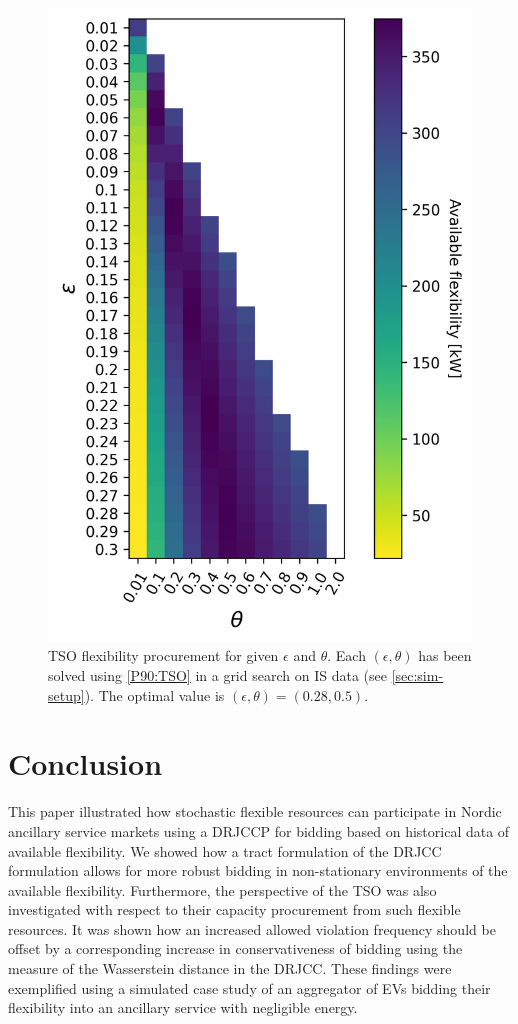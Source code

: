 \documentclass[conference]{IEEEtran}
\begin{document}
\begin{figure}[!t]
    \centering
    \includegraphics[width=0.95\columnwidth]{../figures/heatmap.png}
    \caption{\ac{TSO} flexibility procurement for given $\epsilon$ and $\theta$. Each $(\epsilon, \theta)$ has been solved using \eqref{P90:TSO} in a grid search on \ac{IS} data (see \ref{sec:sim-setup}). The optimal value is $(\epsilon, \theta) = (0.28, 0.5)$. }
    \label{fig:tso}
\end{figure}


\section{Conclusion}

This paper illustrated how stochastic flexible resources can participate in Nordic ancillary service markets using a \ac{DRJCCP} for bidding based on historical data of available flexibility. We showed how a tract formulation of the \ac{DRJCC} formulation allows for more robust bidding in non-stationary environments of the available flexibility. Furthermore, the perspective of the \ac{TSO} was also investigated with respect to their capacity procurement from such flexible resources. It was shown how an increased allowed violation frequency should be offset by a corresponding increase in conservativeness of bidding using the measure of the Wasserstein distance in the \ac{DRJCC}. These findings were exemplified using a simulated case study of an aggregator of \acp{EV} bidding their flexibility into an ancillary service with negligible energy.
\end{document}

